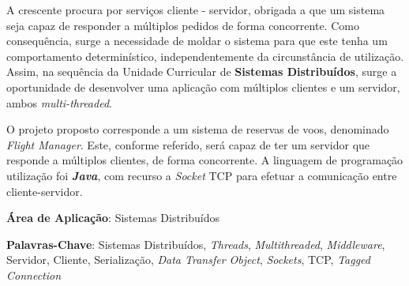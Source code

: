 \documentclass[a4paper,11pt]{scrreprt}
\begin{document}

\makecover



\renewenvironment{abstract}
{\par\noindent\textbf{\Large\abstractname}\par\bigskip}
{}

\begin{flushleft}
    \begin{abstract}
        A crescente procura por serviços cliente - servidor, obrigada a que um sistema seja capaz
        de responder a múltiplos pedidos de forma concorrente.
        Como consequência, surge a necessidade de moldar o sistema para que este tenha um comportamento
        determinístico, independentemente da circunstância de utilização.
        Assim, na sequência da Unidade Curricular de \textbf{Sistemas Distribuídos}, surge a oportunidade
        de desenvolver uma aplicação com múltiplos clientes e um servidor, ambos \textit{multi-threaded}.
        
        O projeto proposto corresponde a um sistema de reservas de voos, denominado \textit{Flight Manager}.
        Este, conforme referido, será capaz de ter um servidor que responde a múltiplos clientes, de forma
        concorrente.
        A linguagem de programação utilização foi \textbf{\textit{Java}}, com recurso a \textit{Socket} TCP
        para efetuar a comunicação entre cliente-servidor.
        
        \par \textbf{Área de Aplicação}: Sistemas Distribuídos
        \par \textbf{Palavras-Chave}: Sistemas Distribuídos, \textit{Threads}, \textit{Multithreaded}, 
        \textit{Middleware}, Servidor, Cliente, Serialização, \textit{Data Transfer Object},
        \textit{Sockets}, TCP, \textit{Tagged Connection}
    \end{abstract}
\end{flushleft}

\pagebreak
\end{document}

